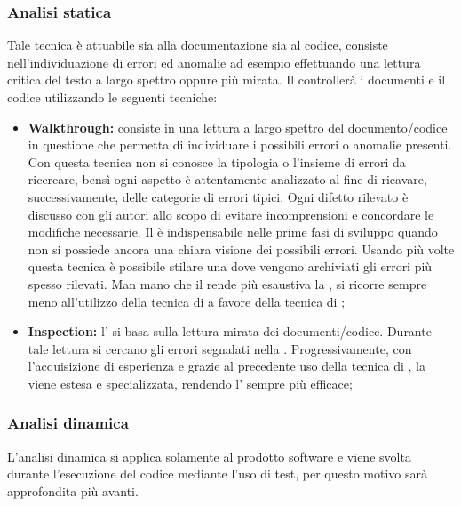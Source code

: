 \documentclass[12pt,a4paper]{article}
\begin{document}
\subsubsection{Analisi statica}
Tale tecnica è attuabile sia alla documentazione sia al codice, consiste nell'individuazione di errori ed anomalie ad esempio effettuando una lettura critica del testo a largo spettro oppure più mirata. Il \VR{} controllerà i documenti e il codice utilizzando le seguenti tecniche:
\begin{itemize}
	\item \textbf{Walkthrough:} consiste in una lettura a largo spettro del documento/codice in questione che permetta di individuare i possibili errori o anomalie presenti. Con questa tecnica non si conosce la tipologia o l'insieme di errori da ricercare, bensì ogni aspetto è attentamente analizzato al fine di ricavare, successivamente, delle categorie di errori tipici. Ogni difetto rilevato è discusso con gli autori allo scopo di evitare incomprensioni e concordare le modifiche necessarie. Il  è indispensabile nelle prime fasi di sviluppo quando non si possiede ancora una chiara visione dei possibili errori. Usando più volte questa tecnica è possibile stilare una  dove vengono archiviati gli errori più spesso rilevati. Man mano che il \VR{} rende più esaustiva la , si ricorre sempre meno all'utilizzo della tecnica di  a favore della tecnica di ;
	\item \textbf{Inspection:} l' si basa sulla lettura mirata dei documenti/codice. Durante tale lettura si cercano gli errori segnalati nella . Progressivamente, con l'acquisizione di esperienza e grazie al precedente uso della tecnica di , la  viene estesa e specializzata, rendendo l' sempre più efficace;
\end{itemize}

\subsubsection{Analisi dinamica}
L’analisi dinamica si applica solamente al prodotto software e viene svolta durante l’esecuzione del codice mediante l’uso di test, per questo motivo sarà approfondita più avanti.
\end{document}
